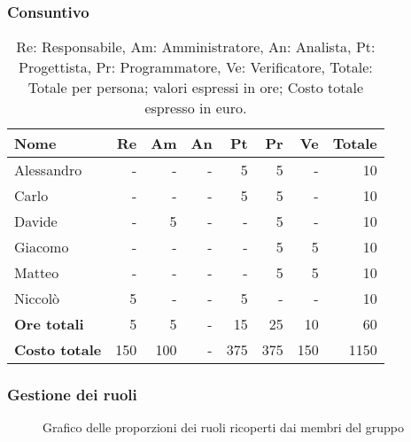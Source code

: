 \subsubsection{Consuntivo}
\begin{table}[H]
	\centering
	\begin{tabular}{l|r|r|r|r|r|r|r}
		\textbf{Nome}         & \textbf{Re} & \textbf{Am} & \textbf{An} & \textbf{Pt} & \textbf{Pr} & \textbf{Ve} & \textbf{Totale} \\
		\hline
		Alessandro            & -           & -           & -           & 5           & 5           & -           & 10              \\
		Carlo                 & -           & -           & -           & 5           & 5           & -           & 10              \\
		Davide                & -           & 5           & -           & -           & 5           & -           & 10              \\
		Giacomo               & -           & -           & -           & -           & 5          	& 5           & 10              \\
		Matteo                & -           & -           & -           & -           & 5           & 5           & 10              \\
		Niccolò               & 5           & -           & -           & 5           & -           & -           & 10              \\
		\hline
		\textbf{Ore totali}   & 5           & 5           & -           & 15          & 25          & 10          & 60              \\
		\textbf{Costo totale} & 150         & 100         & -           & 375         & 375         & 150         & 1150
	\end{tabular}
	\caption{Re: Responsabile, Am: Amministratore, An: Analista, Pt: Progettista,
		Pr: Programmatore, Ve: Verificatore, Totale: Totale per persona; valori espressi in ore; Costo totale espresso in euro.}
\end{table}

\subsubsection{Gestione dei ruoli}
\begin{figure}[h]
	\centering
	\caption{Grafico delle proporzioni dei ruoli ricoperti dai membri del gruppo}
\end{figure}


